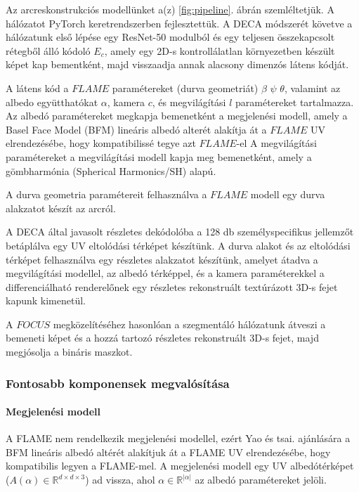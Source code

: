 \documentclass[12pt,a4]{article}
\begin{document}
            
        	Az arcreskonstrukciós modellünket a(z) \ref{fig:pipeline}. ábrán szemléltetjük. A hálózatot PyTorch
        	keretrendszerben fejlesztettük.
        	A DECA módszerét követve a hálózatunk első lépése egy
        	ResNet-50 modulból és egy teljesen összekapcsolt rétegből álló kódoló
        	$E_{c}$, amely egy 2D-s kontrollálatlan környezetben készült képet kap bementként, majd visszaadja annak alacsony dimenzós látens kódját.
         
            A látens kód a $FLAME$
        	paramétereket (durva geometriát) $\beta$ $\psi$ $\theta$, valamint az albedo együtthatókat
        	$\alpha$, kamera $c$, és megvilágítási $l$ paramétereket tartalmazza.
        	Az albedó paramétereket megkapja
        	bemenetként a megjelenési modell, amely a Basel Face Model (BFM)
        	lineáris albedó alterét alakítja át a $FLAME$ UV elrendezésébe,
        	hogy kompatibilissé tegye azt $FLAME$-el A megvilágítási paramétereket
        	a megvilágítási modell kapja meg bemenetként, amely
        	a gömbharmónia (Spherical Harmonics/SH) alapú.
         
            A durva geometria
        	paramétereit felhasználva a $FLAME$ modell egy durva alakzatot készít az
        	arcról. 
 
            A DECA által javasolt részletes dekódolóba a 128 db személyspecifikus jellemzőt betáplálva egy UV eltolódási térképet készítünk. A durva alakot és az eltolódási térképet felhasználva egy részletes alakzatot készítünk, amelyet átadva a megvilágítási modellel,
        	az albedó térképpel, és a kamera paraméterekkel a differenciálható renderelőnek egy részletes rekonstruált textúrázott 3D-s fejet kapunk kimenetül.

 
        	A $FOCUS$ megközelítéséhez hasonlóan a szegmentáló hálózatunk átveszi
        	a bemeneti képet és a hozzá tartozó részletes rekonstruált 3D-s fejet, majd
        	megjósolja a bináris maszkot.

         \subsubsection{Fontosabb komponensek megvalósítása}

         \paragraph{Megjelenési modell}

        A FLAME nem rendelkezik megjelenési modellel, ezért Yao és tsai. \cite{deca} ajánlására a BFM lineáris albedó altérét alakítjuk át
        a FLAME UV elrendezésébe, hogy kompatibilis legyen a FLAME-mel. A megjelenési modell egy UV albedótérképet ($A(\alpha) \in \mathbb{R}^{d \times d \times 3}$) ad vissza, ahol $\alpha \in \mathbb{R}^{|\alpha|}$ az albedó paramétereket jelöli.  
         
\end{document}
